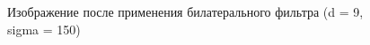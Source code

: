 \documentclass[14pt,a4paper,report]{report}
\begin{document}
\begin{figure}[h]
\begin{minipage}[h]{0.47\linewidth}
\end{minipage}
\hfill
\begin{minipage}[h]{0.47\linewidth}
\end{minipage}
\caption{Изображение после применения билатерального фильтра (d = 9, sigma = 150)}
\label{ris:image1}
\end{figure}
\end{document}
